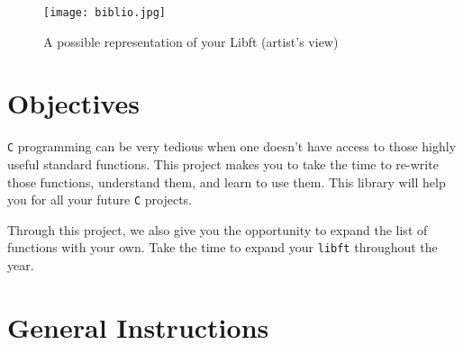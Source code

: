 \documentclass{42-en}
\begin{document}
            \begin{figure}[H]
                \begin{center}
                    \texttt{[image: biblio.jpg]}
                    \caption{A possible representation of your Libft (artist's view)}
                \end{center}
            \end{figure}



\chapter{Objectives}

    \texttt{C} programming can be very tedious when one doesn’t have
    access to those highly useful standard functions. This project
    makes you to take the time to re-write those functions, understand
    them, and learn to use them. This library will help you for all
    your future \texttt{C} projects.

    Through this project, we also give you the opportunity to
    expand the list of functions with your own. Take the
    time to expand your \texttt{libft} throughout the year.



\chapter{General Instructions}
\end{document}
